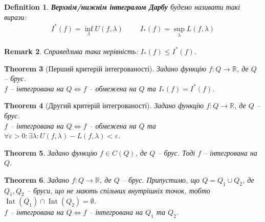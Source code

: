 \documentclass[a4paper, 10pt]{article}
\theoremstyle{theoremdd}
\newtheorem{theorem}{Theorem}[subsection]
\theoremstyle{theoremdd}
\newtheorem{definition}[theorem]{Definition}
\theoremstyle{theoremdd}
\theoremstyle{theoremdd}
\theoremstyle{theoremdd}
\theoremstyle{theoremdd}
\newtheorem{remark}[theorem]{Remark}
\theoremstyle{theoremdd}
\theoremstyle{theoremdd}
\DeclareMathOperator{\Int}{Int}
\begin{document}
\begin{definition}
\textbf{Верхнім/нижнім інтегралом Дарбу} будемо називати такі вирази:
\begin{align*}
I^*(f) = \inf_\lambda U(f,\lambda) \hspace{1cm} I_*(f) = \sup_{\lambda} L(f,\lambda)
\end{align*}
\end{definition}

\begin{remark}
Справедлива така нерівність: $I_*(f) \leq I^*(f)$.
\end{remark}

\begin{theorem}[Перший критерій інтегрованості]
Задано функцію $f \colon Q \to \mathbb{R}$, де $Q$ -- брус.\\
$f$ -- інтегрована на $Q \iff f$ -- обмежена на $Q$ та $I_*(f) = I^*(f)$.
\end{theorem}

\begin{theorem}[Другий критерій інтегрованості]
Задано функцію $f \colon Q \to \mathbb{R}$, де $Q$ -- брус.\\
$f$ -- інтегрована на $Q \iff f$ -- обмежена на $Q$ та $\forall \varepsilon > 0: \exists \lambda: U(f,\lambda) - L(f,\lambda) < \varepsilon$.
\end{theorem}

\begin{theorem}
Задано функцію $f \in C(Q)$, де $Q$ -- брус. Тоді $f$ -- інтегрована на $Q$.
\end{theorem}

\begin{theorem}
Задано $f \colon Q \to \mathbb{R}$, де $Q$ -- брус. Припустимо, що $Q = Q_1 \cup Q_2$, де $Q_1,Q_2$ -- бруси, що не мають спільних внутрішніх точок, тобто $\Int(Q_1) \cap \Int(Q_2) = \emptyset$.\\
$f$ -- інтегрована на $Q \iff f$ -- інтегрована на $Q_1$ та $Q_2$.
\end{theorem}
\end{document}
